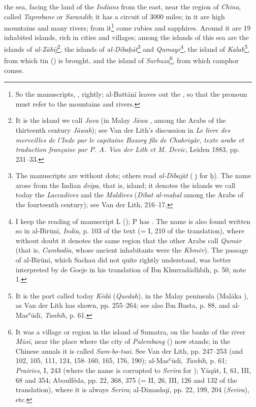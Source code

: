 \documentclass[11pt]{article}
\begin{document}
the sea, facing the land of the \emph{Indians} from the east, near the region of \emph{China}, called \emph{Taprobane} or \emph{Sarandīb}; it has a circuit of 3000 miles; in it are high mountains and many rivers; from it\footnote{So the manuscripts, , rightly; al-Battānī leaves out the , so that the pronoun must refer to the mountains and rivers.} come rubies and sapphires. Around it are 19 inhabited islands, rich in cities and villages; among the islands of this sea are the islands of \emph{al-Zābij}\footnote{It is the island we call \emph{Java} (in Malay \emph{Jāwa} , among the Arabs of the thirteenth century \emph{Jāwah}); see Van der Lith's discussion in \emph{Le livre des merveilles de l’Inde par le capitaine Bozorg fils de Chahriyâr, texte arabe et traduction française par P. A. Van der Lith et M. Devic}, Leiden 1883, pp. 231–33.}, the islands of \emph{al-Dībaḥāt}\footnote{The manuscripts are without dots; others read \emph{al-Dībajāt} ( j for  ḥ). The name arose from the Indian \emph{dvīpa}, that is, island; it denotes the islands we call today the \emph{Laccadives} and the \emph{Maldives} (\emph{Dībat al-maḥal} among the Arabs of the fourteenth century); see Van der Lith, 216–17.} and \emph{Qumayr}\footnote{I keep the reading of manuscript L (); P has . The name is also found written so in al-Bīrūnī, \emph{India}, p. 103 of the text (= I, 210 of the translation), where without doubt it denotes the same region that the other Arabs call  \emph{Qumār} (that is, \emph{Cambodia}, whose ancient inhabitants were the \emph{Khmēr}). The passage of al-Bīrūnī, which Sachau did not quite rightly understand, was better interpreted by de Goeje in his translation of Ibn Khurradādhbih, p. 50, note 1.}, the island of \emph{Kalah}\footnote{It is the port called today \emph{Kēdā} (\emph{Quedah}), in the Malay peninsula (Malāka ), as Van der Lith has shown, pp. 255–264; see also Ibn Rusta, p. 88, and al-Masʿūdī, \emph{Tanbīh}, p. 61.}, from which tin () is brought, and the island of \emph{Sarbuza}\footnote{It was a village or region in the island of Sumatra, on the banks of the river \emph{Mūsī}, near the place where the city of \emph{Palembang} () now stands; in the Chinese annals it is called \emph{Sam-bo-tsai}. See Van der Lith, pp. 247–253 (and 102, 105, 111, 124, 158–160, 165, 176, 190); al-Masʿūdī, \emph{Tanbīh}, p. 61; \emph{Prairies}, I, 243 (where the name is corrupted to \emph{Serīra}  for ); Yāqūt, I, 61, III, 68 and 354; Aboulféda, pp. 22, 368, 375 (= II, 26, III, 126 and 132 of the translation), where it is always \emph{Serīra}; al-Dimashqī, pp. 22, 199, 204 (\emph{Serīra}), etc.}, from which camphor comes.\par
\end{document}
